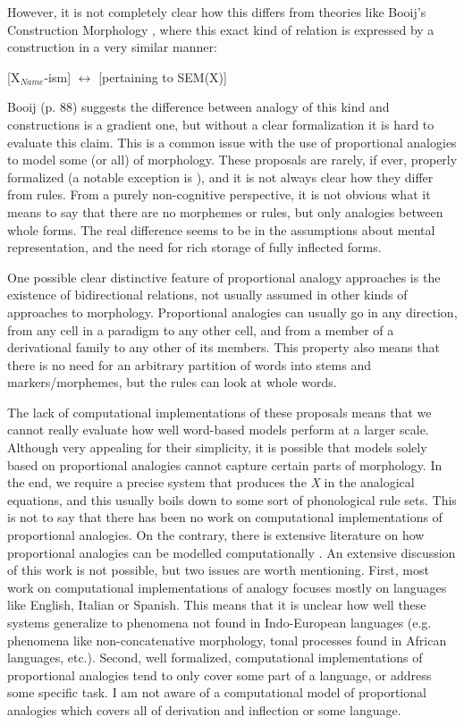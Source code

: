 However, it is not completely clear how this differs from theories like Booij's Construction Morphology \autocite{Booij.2010}, where this exact kind of relation is expressed by a construction in a very similar manner:

\begin{exe}
    \ex \label{analogy-derivation-ism-cxt} [X$_{Name}$-ism] $\leftrightarrow$ [pertaining to SEM(X)]
\end{exe}

Booij (p. 88) suggests the difference between analogy of this kind and constructions is a gradient one, but without a clear formalization it is hard to evaluate this claim. This is a common issue with the use of proportional analogies to model some (or all) of morphology. These proposals are rarely, if ever, properly formalized (a notable exception is \textcite{Beniamine.2017}), and it is not always clear how they differ from rules. From a purely non-cognitive perspective, it is not obvious what it means to say that there are no morphemes or rules, but only analogies between whole forms. The real difference seems to be in the assumptions about mental representation, and the need for rich storage of fully inflected forms.

One possible clear distinctive feature of proportional analogy approaches is the existence of bidirectional relations, not usually assumed in other kinds of approaches to morphology. Proportional analogies can usually go in any direction, from any cell in a paradigm to any other cell, and from a member of a derivational family to any other of its members. This property also means that there is no need for an arbitrary partition of words into stems and markers/morphemes, but the rules can look at whole words.

The lack of computational implementations of these proposals means that we cannot really evaluate how well word-based models perform at a larger scale. Although very appealing for their simplicity, it is possible that models solely based on proportional analogies cannot capture certain parts of morphology. In the end, we require a precise system that produces the \textit{X} in the analogical equations, and this usually boils down to some sort of phonological rule sets. This is not to say that there has been no work on computational implementations of proportional analogies. On the contrary, there is extensive literature on how proportional analogies can be modelled computationally \autocites{Federici.1995b, Fertig.2013, Goldsmith.2007, Lepage.1998, Pirrelli.1994a, Pirrelli.1994, Yvon.1997}. An extensive discussion of this work is not possible, but two issues are worth mentioning. First, most work on computational implementations of analogy focuses mostly on languages like English, Italian or Spanish. This means that it is unclear how well these systems generalize to phenomena not found in Indo-European languages (e.g. phenomena like non-concatenative morphology, tonal processes found in African languages, etc.). Second, well formalized, computational implementations of proportional analogies tend to only cover some part of a language, or address some specific task. I am not aware of a computational model of proportional analogies which covers all of derivation and inflection or some language.

